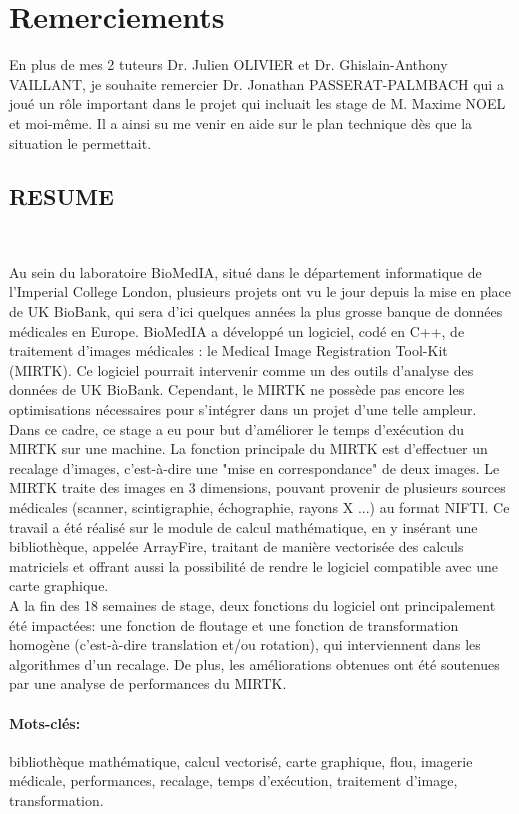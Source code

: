 \documentclass[10pt]{report}
\begin{document}
\section*{Remerciements}
En plus de mes 2 tuteurs Dr. Julien OLIVIER et Dr. Ghislain-Anthony VAILLANT, je souhaite remercier Dr. Jonathan PASSERAT-PALMBACH qui a joué un rôle important dans le projet qui incluait les stage de M. Maxime NOEL et moi-même. Il a ainsi su me venir en aide sur le plan technique dès que la situation le permettait.
\newpage
\subsection*{RESUME} 
~\par 
Au sein du laboratoire BioMedIA, situé dans le département informatique de l'Imperial College London, plusieurs projets ont vu le jour depuis la mise en place de UK BioBank, qui sera d'ici quelques années la plus grosse banque de données médicales en Europe. BioMedIA a développé un logiciel, codé en C++, de traitement d'images médicales : le Medical Image Registration Tool-Kit (MIRTK). Ce logiciel pourrait intervenir comme un des outils d'analyse des données de UK BioBank. Cependant, le MIRTK ne possède pas encore les optimisations nécessaires pour s'intégrer dans un projet d'une telle ampleur.\\
Dans ce cadre, ce stage a eu pour but d'améliorer le temps d'exécution du MIRTK sur une machine. La fonction principale du MIRTK est d'effectuer un recalage d'images, c'est-à-dire une "mise en correspondance" de deux images. Le MIRTK traite des images en 3 dimensions, pouvant provenir de plusieurs sources médicales (scanner, scintigraphie, échographie, rayons X ...) au format NIFTI. Ce travail a été réalisé sur le module de calcul mathématique, en y insérant une bibliothèque, appelée ArrayFire, traitant de manière vectorisée des calculs matriciels et offrant aussi la possibilité de rendre le logiciel compatible avec une carte graphique. \\
A la fin des 18 semaines de stage, deux fonctions du logiciel ont principalement été impactées: une fonction de floutage et une fonction de transformation homogène (c'est-à-dire translation et/ou rotation), qui interviennent dans les algorithmes d'un recalage. De plus, les améliorations obtenues ont été soutenues par une analyse de performances du MIRTK.
~\par 
\paragraph*{Mots-clés:}
bibliothèque mathématique, calcul vectorisé, carte graphique, flou, imagerie médicale, performances, recalage, temps d'exécution, traitement d'image, transformation.
~\par \vspace{0.5cm}
\end{document}
